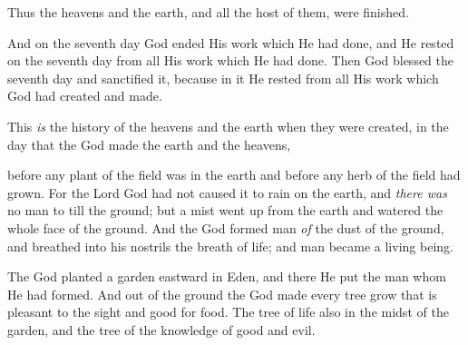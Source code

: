 

\bverse Thus the heavens and the earth, and all the host of them, were finished.

\bverse And on the seventh day God ended His work which He had done, and He rested on the seventh day from all His work which He had done.
\bverse Then God blessed the seventh day and sanctified it, because in it He rested from all His work which God had created and made.
		
\bverse This \textit{is} the history of the heavens and the earth when they were created, in the day that the  God made the earth and the heavens,
	
\bverse before any plant of the field was in the earth and before any herb of the field had grown. For the Lord God had not caused it to rain on the earth, and \textit{there was} no man to till the ground;
\bverse but a mist went up from the earth and watered the whole face of the ground.
\bverse And the \lord God formed man \textit{of} the dust of the ground, and breathed into his nostrils the breath of life; and man became a living being.

\bverse The \lord God planted a garden eastward in Eden, and there He put the man whom He had formed.
\bverse And out of the ground the \lord God made every tree grow that is pleasant to the sight and good for food. The tree of life \was also in the midst of the garden, and the tree of the knowledge of good and evil.

